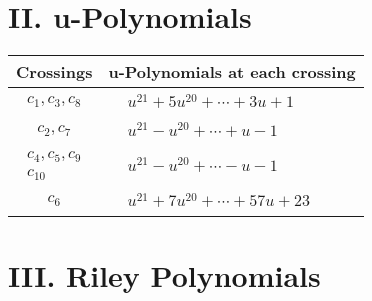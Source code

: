 \documentclass[1p]{elsarticle_modified}
\theoremstyle{definition}
\begin{document}
\newpage\renewcommand{\arraystretch}{1}
\centering \section*{ II. u-Polynomials}
\begin{tabular}{m{50pt}|m{274pt}}
Crossings & \hspace{64pt}u-Polynomials at each crossing \\
\hline $$\begin{aligned}c_{1},c_{3},c_{8}\end{aligned}$$&$\begin{aligned}
&u^{21}+5 u^{20}+\cdots+3 u+1
\end{aligned}$\\
\hline $$\begin{aligned}c_{2},c_{7}\end{aligned}$$&$\begin{aligned}
&u^{21}- u^{20}+\cdots+u-1
\end{aligned}$\\
\hline $$\begin{aligned}c_{4},c_{5},c_{9}\\c_{10}\end{aligned}$$&$\begin{aligned}
&u^{21}- u^{20}+\cdots- u-1
\end{aligned}$\\
\hline $$\begin{aligned}c_{6}\end{aligned}$$&$\begin{aligned}
&u^{21}+7 u^{20}+\cdots+57 u+23
\end{aligned}$\\
\hline
\end{tabular}\newpage\renewcommand{\arraystretch}{1}
\centering \section*{ III. Riley Polynomials}
\end{document}
